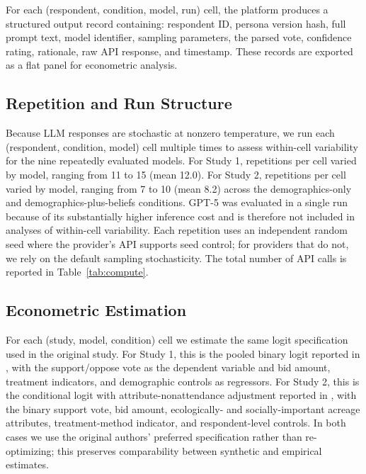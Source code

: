 \documentclass[12pt]{article}
\begin{document}
For each (respondent, condition, model, run) cell, the platform produces
a structured output record containing: respondent ID, persona version
hash, full prompt text, model identifier, sampling parameters, the parsed
vote, confidence rating, rationale, raw API response, and timestamp.
These records are exported as a flat panel for econometric analysis.

\subsection{Repetition and Run Structure}\label{sec:methods-repetition}

Because LLM responses are stochastic at nonzero temperature, we run each
(respondent, condition, model) cell multiple times to assess within-cell
variability for the nine repeatedly evaluated models. For Study 1,
repetitions per cell varied by model, ranging from 11 to 15
(mean 12.0). For Study 2, repetitions per cell varied by model, ranging
from 7 to 10 (mean 8.2) across the demographics-only and
demographics-plus-beliefs conditions. GPT-5 was evaluated in a single
run because of its substantially higher inference cost and is therefore
not included in analyses of within-cell variability. Each repetition
uses an independent random seed where the provider's API supports seed
control; for providers that do not, we rely on the default sampling
stochasticity. The total number of API calls is reported in
Table~\ref{tab:compute}.

\label{tab:compute}

\subsection{Econometric Estimation}\label{sec:methods-econ}

For each (study, model, condition) cell we estimate the same logit
specification used in the original study. For Study 1, this is the pooled
binary logit reported in \textcite{Aldy2012}, with the support/oppose vote
as the dependent variable and bid amount, treatment indicators, and
demographic controls as regressors. For Study 2, this is the conditional
logit with attribute-nonattendance adjustment reported in
\textcite{Giguere2020}, with the binary support vote, bid amount,
ecologically- and socially-important acreage attributes, treatment-method
indicator, and respondent-level controls. In both cases we use the
original authors' preferred specification rather than re-optimizing; this
preserves comparability between synthetic and empirical estimates.
\end{document}
